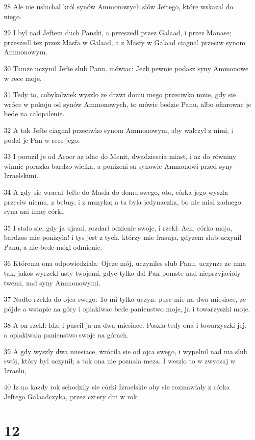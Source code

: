 \par 28 Ale nie usluchal król synów Ammonowych slów Jeftego, które wskazal do niego.
\par 29 I byl nad Jeftem duch Panski, a przeszedl przez Galaad, i przez Manase; przeszedl tez przez Masfa w Galaad, a z Masfy w Galaad ciagnal przeciw synom Ammonowym.
\par 30 Tamze uczynil Jefte slub Panu, mówiac: Jezli pewnie podasz syny Ammonowe w rece moje,
\par 31 Tedy to, cobykolwiek wyszlo ze drzwi domu mego przeciwko mnie, gdy sie wróce w pokoju od synów Ammonowych, to mówie bedzie Panu, albo ofiarowac je bede na calopalenie.
\par 32 A tak Jefte ciagnal przeciwko synom Ammonowym, aby walczyl z nimi, i podal je Pan w rece jego.
\par 33 I porazil je od Aroer az idac do Menit, dwadziescia miast, i az do równiny winnic porazka bardzo wielka, a ponizeni sa synowie Ammonowi przed syny Izraelskimi.
\par 34 A gdy sie wracal Jefte do Masfa do domu swego, oto, córka jego wyszla przeciw niemu, z bebny, i z muzyka; a ta byla jedynaczka, bo nie mial zadnego syna ani innej córki.
\par 35 I stalo sie, gdy ja ujrzal, rozdarl odzienie swoje, i rzekl: Ach, córko moja, bardzos mie ponizyla! i tys jest z tych, którzy mie frasuja, gdyzem slub uczynil Panu, a nie bede mógl odmienic.
\par 36 Któremu ona odpowiedziala: Ojcze mój, uczyniles slub Panu, uczynze ze mna tak, jakos wyrzekl usty twojemi, gdyc tylko dal Pan pomste nad nieprzyjacioly twemi, nad syny Ammonowymi.
\par 37 Nadto rzekla do ojca swego: To mi tylko uczyn: pusc mie na dwa miesiace, ze pójde a wstapie na góry i oplakiwac bede panienstwo moje, ja i towarzyszki moje.
\par 38 A on rzekl: Idz; i puscil ja na dwa miesiace. Poszla tedy ona i towarzyszki jej, a oplakiwala panienstwo swoje na górach.
\par 39 A gdy wyszly dwa miesiace, wrócila sie od ojca swego, i wypelnil nad nia slub swój, który byl uczynil; a tak ona nie poznala meza. I weszlo to w zwyczaj w Izraelu,
\par 40 Iz na kazdy rok schodzily sie córki Izraelskie aby sie rozmawialy z córka Jeftego Galaadczyka, przez cztery dni w rok.

\chapter{12}

